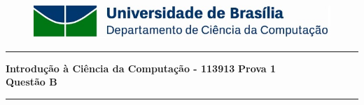 \documentclass[a4paper, 12pt]{article}
\begin{document}
\begin{figure}[H]
	\includegraphics[scale=0.9]{UnB_CiC_Logo.jpg}
\end{figure}
\noindent\rule{\textwidth}{0.4pt}
\begin{center}
	\textbf{{\Large Introdução à Ciência da Computação - 113913}} \newline \newline
	\textbf{{\large Prova 1} \\
	\vspace{9pt}
	{\large Questão B}} \\
	\noindent\rule{\textwidth}{0.4pt}
	\newline
\end{center}
\end{document}
